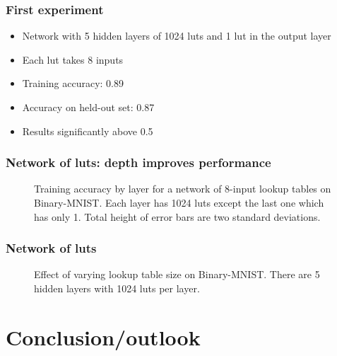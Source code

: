 \documentclass[pdflatex,compress]{beamer}
\begin{document}
\begin{frame}
	\frametitle{First experiment}
	\begin{itemize}[<+->]
		\item Network with 5 hidden layers of 1024 luts and 1 lut in the output layer
			\vspace{1em}
		\item Each lut takes 8 inputs
			\vspace{1em}
		\item Training accuracy: 0.89
			\vspace{1em}
		\item Accuracy on held-out set: 0.87
			\vspace{1em}
		\item Results significantly above 0.5
	\end{itemize}
\end{frame}

\begin{frame}
	\frametitle{Network of luts: depth improves performance}
	\begin{figure}[ht]
		\centering
		
		\caption*{Training accuracy by layer for a network of 8-input lookup tables on Binary-MNIST. Each layer has 1024 luts except the last one which has only 1. Total height of error bars are two standard deviations.}
	\end{figure}
\end{frame}

\begin{frame}
	\frametitle{Network of luts}
	\begin{figure}
		\begin{minipage}[b]{.98\linewidth}
			\centering
				\begin{minipage}[b]{.48\textwidth}
				\centering
				
				\end{minipage}
				\begin{minipage}[b]{.48\textwidth}
				\centering
				
				\end{minipage}
		\end{minipage}
	\caption*{Effect of varying lookup table size on Binary-MNIST. There are 5 hidden layers with 1024 luts per layer.}
	\end{figure}

\end{frame}

\section{Conclusion/outlook}
\end{document}
